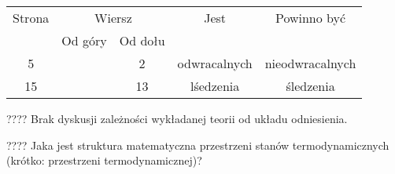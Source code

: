 \documentclass[a4paper,11pt]{article}
\begin{document}
\begin{center}

  \begin{tabular}{|c|c|c|c|c|}
    \hline
    Strona & \multicolumn{2}{c|}{Wiersz} & Jest
                              & Powinno być \\ \cline{2-3}
    & Od góry & Od dołu & & \\
    \hline
    5   & &  2 & odwracalnych & nieodwracalnych \\
    15  & & 13 & lśedzenia & śledzenia \\
    \hline
  \end{tabular}

\end{center}

\vspace{\spaceTwo}













\vspace{0em}



\vspace{0em}


\noindent
???? Brak dyskusji zależności wykładanej teorii od układu odniesienia.

\vspace{\spaceFour}





\noindent
???? Jaka jest struktura matematyczna przestrzeni stanów termodynamicznych
(krótko: przestrzeni termodynamicznej)?
\end{document}
